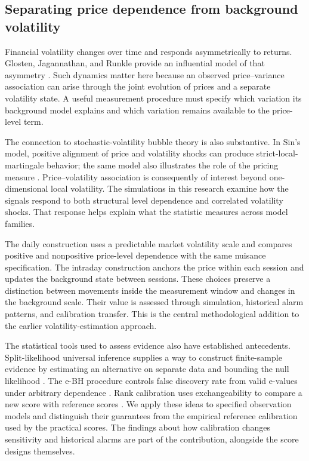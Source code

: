 \subsection{Separating price dependence from background volatility}
Financial volatility changes over time and responds asymmetrically to
returns. Glosten, Jagannathan, and Runkle provide an influential model of
that asymmetry \cite{glosten1993relation}. Such dynamics matter here
because an observed price--variance association can arise through the
joint evolution of prices and a separate volatility state. A useful
measurement procedure must specify which variation its background model
explains and which variation remains available to the price-level term.

The connection to stochastic-volatility bubble theory is also substantive.
In Sin's model, positive alignment of price and volatility shocks can
produce strict-local-martingale behavior; the same model also illustrates
the role of the pricing measure \cite{sin1995complications}. Price--volatility
association is consequently of interest beyond one-dimensional local
volatility. The simulations in this research examine how the signals respond
to both structural level dependence and correlated volatility shocks.
That response helps explain what the statistic measures across model
families.

The daily construction uses a predictable market volatility scale and
compares positive and nonpositive price-level dependence with the same
nuisance specification. The intraday construction anchors the price
within each session and updates the background state between sessions.
These choices preserve a distinction between movements inside the
measurement window and changes in the background scale. Their value is
assessed through simulation, historical alarm patterns, and calibration
transfer. This is the central methodological addition to the earlier
volatility-estimation approach.

The statistical tools used to assess evidence also have established
antecedents. Split-likelihood universal inference supplies a way to
construct finite-sample evidence by estimating an alternative on separate
data and bounding the null likelihood \cite{wasserman2019universal}.
The e-BH procedure controls false discovery rate from valid e-values
under arbitrary dependence \cite{wang2020false}. Rank calibration uses
exchangeability to compare a new score with reference scores
\cite{tibshirani2019conformal}. We apply these ideas to specified
observation models and distinguish their guarantees from the empirical
reference calibration used by the practical scores. The findings about
how calibration changes sensitivity and historical alarms are part of
the contribution, alongside the score designs themselves.

